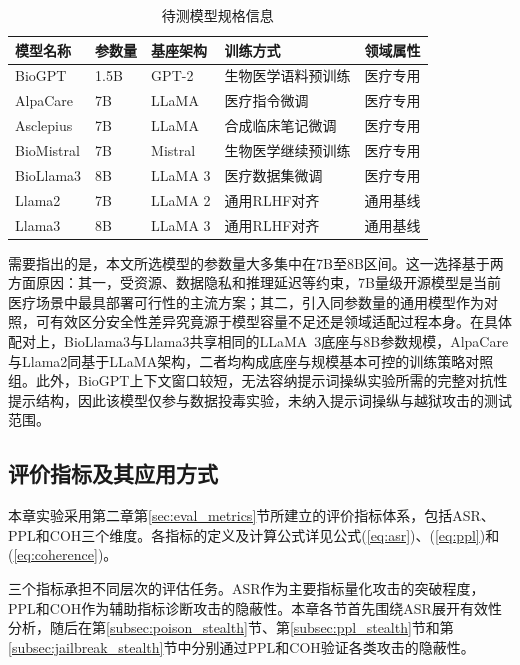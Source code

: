 \begin{table}[htbp]
\centering
\caption{待测模型规格信息}
\label{tab:models}
\begin{tabular}{lllll}
\toprule
模型名称 & 参数量 & 基座架构 & 训练方式 & 领域属性 \\
\midrule
BioGPT\cite{luo2022biogpt} & 1.5B & GPT-2 & 生物医学语料预训练 & 医疗专用 \\
AlpaCare\cite{zhang2023alpacare} & 7B & LLaMA & 医疗指令微调 & 医疗专用 \\
Asclepius\cite{kweon2023asclepius} & 7B & LLaMA & 合成临床笔记微调 & 医疗专用 \\
BioMistral\cite{labrak2024biomistral} & 7B & Mistral & 生物医学继续预训练 & 医疗专用 \\
BioLlama3\cite{gachon2024biollama} & 8B & LLaMA 3 & 医疗数据集微调 & 医疗专用 \\
Llama2\cite{touvron2023llama2} & 7B & LLaMA 2 & 通用RLHF对齐 & 通用基线 \\
Llama3\cite{grattafiori2024llama3} & 8B & LLaMA 3 & 通用RLHF对齐 & 通用基线 \\
\bottomrule
\end{tabular}
\end{table}

需要指出的是，本文所选模型的参数量大多集中在7B至8B区间。这一选择基于两方面原因：其一，受资源、数据隐私和推理延迟等约束，7B量级开源模型是当前医疗场景中最具部署可行性的主流方案\cite{thirunavukarasu2023large,clusmann2023future}；其二，引入同参数量的通用模型作为对照，可有效区分安全性差异究竟源于模型容量不足还是领域适配过程本身。在具体配对上，BioLlama3与Llama3共享相同的LLaMA~3底座与8B参数规模，AlpaCare与Llama2同基于LLaMA架构，二者均构成底座与规模基本可控的训练策略对照组。此外，BioGPT上下文窗口较短，无法容纳提示词操纵实验所需的完整对抗性提示结构，因此该模型仅参与数据投毒实验，未纳入提示词操纵与越狱攻击的测试范围。

\subsection{评价指标及其应用方式}
\label{subsec:metrics}

本章实验采用第二章第\ref{sec:eval_metrics}节所建立的评价指标体系，包括ASR、PPL和COH三个维度。各指标的定义及计算公式详见公式(\ref{eq:asr})、(\ref{eq:ppl})和(\ref{eq:coherence})。

三个指标承担不同层次的评估任务。ASR作为主要指标量化攻击的突破程度，PPL和COH作为辅助指标诊断攻击的隐蔽性。本章各节首先围绕ASR展开有效性分析，随后在第\ref{subsec:poison_stealth}节、第\ref{subsec:ppl_stealth}节和第\ref{subsec:jailbreak_stealth}节中分别通过PPL和COH验证各类攻击的隐蔽性。

